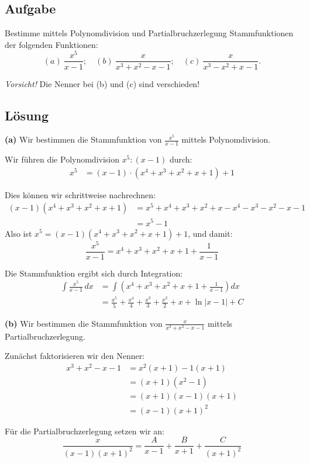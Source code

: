 \documentclass{article}
\begin{document}
\subsection*{Aufgabe}
Bestimme mittels Polynomdivision und Partialbruchzerlegung Stammfunktionen der folgenden Funktionen:
$$
(a)\ \frac{x^5}{x-1};\quad
(b)\ \frac{x}{x^3+x^2-x-1};\quad
(c)\ \frac{x}{x^3-x^2+x-1}.
$$

\textit{Vorsicht!} Die Nenner bei (b) und (c) sind verschieden!

\subsection*{Lösung}

\textbf{(a)} Wir bestimmen die Stammfunktion von $\frac{x^5}{x-1}$ mittels Polynomdivision.

Wir führen die Polynomdivision $x^5 : (x-1)$ durch:
\begin{align*}
x^5 &= (x-1) \cdot (x^4 + x^3 + x^2 + x + 1) + 1
\end{align*}

Dies können wir schrittweise nachrechnen:
\begin{align*}
(x-1)(x^4 + x^3 + x^2 + x + 1) &= x^5 + x^4 + x^3 + x^2 + x - x^4 - x^3 - x^2 - x - 1\\
&= x^5 - 1
\end{align*}
Also ist $x^5 = (x-1)(x^4 + x^3 + x^2 + x + 1) + 1$, und damit:
$$\frac{x^5}{x-1} = x^4 + x^3 + x^2 + x + 1 + \frac{1}{x-1}$$

Die Stammfunktion ergibt sich durch Integration:
\begin{align*}
\int \frac{x^5}{x-1} \, dx &= \int \left(x^4 + x^3 + x^2 + x + 1 + \frac{1}{x-1}\right) dx\\
&= \frac{x^5}{5} + \frac{x^4}{4} + \frac{x^3}{3} + \frac{x^2}{2} + x + \ln|x-1| + C
\end{align*}

\textbf{(b)} Wir bestimmen die Stammfunktion von $\frac{x}{x^3+x^2-x-1}$ mittels Partialbruchzerlegung.

Zunächst faktorisieren wir den Nenner:
\begin{align*}
x^3 + x^2 - x - 1 &= x^2(x+1) - 1(x+1)\\
&= (x+1)(x^2-1)\\
&= (x+1)(x-1)(x+1)\\
&= (x-1)(x+1)^2
\end{align*}

Für die Partialbruchzerlegung setzen wir an:
$$\frac{x}{(x-1)(x+1)^2} = \frac{A}{x-1} + \frac{B}{x+1} + \frac{C}{(x+1)^2}$$
\end{document}
